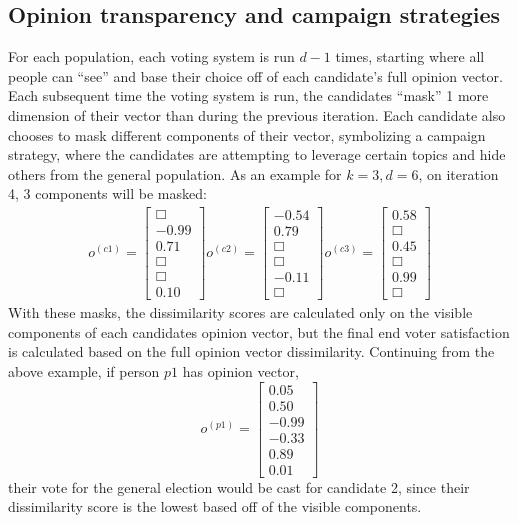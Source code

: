 \subsection{Opinion transparency and campaign strategies}
For each population, each voting system is run $d-1$ times, starting where all people can ``see'' and base their choice off of each candidate's full opinion vector.
Each subsequent time the voting system is run, the candidates ``mask'' 1 more dimension of their vector than during the previous iteration.
Each candidate also chooses to mask different components of their vector, symbolizing a campaign strategy, where the candidates are attempting to leverage certain topics and hide others from the general population.
As an example for $k = 3, d = 6$, on iteration 4, 3 components will be masked:
\begin{align*}
o^{(c1)} = \begin{bmatrix}\Box \\ -0.99 \\ 0.71 \\ \Box \\ \Box \\ 0.10  \end{bmatrix}
o^{(c2)} = \begin{bmatrix}-0.54 \\ 0.79 \\ \Box \\ \Box \\ -0.11\\ \Box  \end{bmatrix}
o^{(c3)} = \begin{bmatrix}0.58 \\ \Box \\ 0.45 \\ \Box \\ 0.99 \\ \Box  \end{bmatrix}
\end{align*}
With these masks, the dissimilarity scores are calculated only on the visible components of each candidates opinion vector, but the final end voter satisfaction is calculated based on the full opinion vector dissimilarity.
Continuing from the above example, if person $p1$ has opinion vector, $$o^{(p1)}=\begin{bmatrix}0.05\\0.50\\-0.99\\-0.33\\0.89\\0.01\end{bmatrix}$$ their vote for the general election would be cast for candidate 2, since their dissimilarity score is the lowest based off of the visible components.
